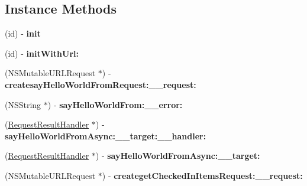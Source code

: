 \subsection*{Instance Methods}
\begin{DoxyCompactItemize}
\item 
\hypertarget{interface_supply_chain_service_port_binding_a035ca0c56aa687d692f4666803d8af07}{}(id) -\/ {\bfseries init}\label{interface_supply_chain_service_port_binding_a035ca0c56aa687d692f4666803d8af07}

\item 
\hypertarget{interface_supply_chain_service_port_binding_a708f155d15606edc6ffe65a90e84858d}{}(id) -\/ {\bfseries init\+With\+Url\+:}\label{interface_supply_chain_service_port_binding_a708f155d15606edc6ffe65a90e84858d}

\item 
\hypertarget{interface_supply_chain_service_port_binding_a11192f0c5b6091d7acfdbe23913f846c}{}(N\+S\+Mutable\+U\+R\+L\+Request $\ast$) -\/ {\bfseries createsay\+Hello\+World\+From\+Request\+:\+\_\+\+\_\+request\+:}\label{interface_supply_chain_service_port_binding_a11192f0c5b6091d7acfdbe23913f846c}

\item 
\hypertarget{interface_supply_chain_service_port_binding_ad1eca08561212b5c7026b83797f486f0}{}(N\+S\+String $\ast$) -\/ {\bfseries say\+Hello\+World\+From\+:\+\_\+\+\_\+error\+:}\label{interface_supply_chain_service_port_binding_ad1eca08561212b5c7026b83797f486f0}

\item 
\hypertarget{interface_supply_chain_service_port_binding_a6e0e445a094fec19ffa17f9db52abfce}{}(\hyperlink{interface_request_result_handler}{Request\+Result\+Handler} $\ast$) -\/ {\bfseries say\+Hello\+World\+From\+Async\+:\+\_\+\+\_\+target\+:\+\_\+\+\_\+handler\+:}\label{interface_supply_chain_service_port_binding_a6e0e445a094fec19ffa17f9db52abfce}

\item 
\hypertarget{interface_supply_chain_service_port_binding_aa59589d4c41b1a197a26cc14660f7799}{}(\hyperlink{interface_request_result_handler}{Request\+Result\+Handler} $\ast$) -\/ {\bfseries say\+Hello\+World\+From\+Async\+:\+\_\+\+\_\+target\+:}\label{interface_supply_chain_service_port_binding_aa59589d4c41b1a197a26cc14660f7799}

\item 
\hypertarget{interface_supply_chain_service_port_binding_a4290c8be0be4f61c4c2b86db2bddb181}{}(N\+S\+Mutable\+U\+R\+L\+Request $\ast$) -\/ {\bfseries createget\+Checked\+In\+Items\+Request\+:\+\_\+\+\_\+request\+:}\label{interface_supply_chain_service_port_binding_a4290c8be0be4f61c4c2b86db2bddb181}


\end{DoxyCompactItemize}
